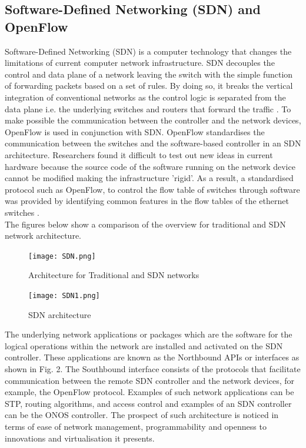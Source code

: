 \documentclass{article}
\begin{document}
\subsection{Software-Defined Networking (SDN) and OpenFlow} 
Software-Defined Networking (SDN) is a computer technology that changes the limitations of current computer network infrastructure. SDN \citep{6587999} decouples the control and data plane of a network leaving the switch with the simple function of forwarding packets based on a set of rules. By doing so, it breaks the vertical integration of conventional networks as the control logic is separated from the data plane i.e. the underlying switches and routers that forward the traffic \citep{6994333}. To make possible the communication between the controller and the network devices, OpenFlow \citep{6587999} is used in conjunction with SDN. OpenFlow standardises the communication between the switches and the software-based controller in an SDN architecture. Researchers found it difficult to test out new ideas in current hardware because the source code of the software running on the network device cannot be modified making the infrastructure 'rigid'. As a result, a standardised protocol such as OpenFlow, to control the flow table of switches through software was provided by identifying common features in the flow tables of the ethernet switches \citep{6587999}.\\The figures below show a comparison of the overview for traditional and SDN network architecture.\\
	\begin{figure}[h]
        		\centering
		\small
        		\texttt{[image: SDN.png]}
        		\caption{Architecture for Traditional and SDN networks}
        		\label{fig:SDN1}
	\end{figure}
    
	\newpage
    	\begin{figure}[h]
        		\centering
		\small
        		\texttt{[image: SDN1.png]}
        		\caption{SDN architecture}
       		 \label{fig:SDN2}
    	\end{figure} 
The underlying network applications or packages which are the software for the logical operations within the network are installed and activated on the SDN controller. These applications are known as the Northbound APIs or interfaces as shown in Fig. 2. The Southbound interface consists of the protocols that facilitate communication between the remote SDN controller and the network devices, for example, the OpenFlow \citep{10220519} protocol. Examples of such network applications can be STP, routing algorithms, and access control and examples of an SDN controller can be the ONOS controller. The prospect of such architecture is noticed in terms of ease of network management, programmability and openness to innovations and virtualisation it presents.
\end{document}
